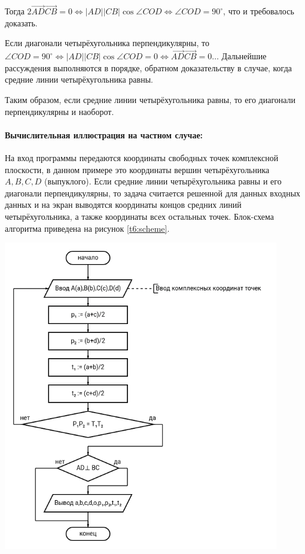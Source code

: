 {   Тогда \(2 \overrightarrow{AD} \overrightarrow{CB} = 0\Leftrightarrow \left\lvert AD\right\rvert
   \left\lvert CB\right\rvert \cos{\angle{COD}} \Leftrightarrow \angle{COD} = 90^\circ\),
   что и требовалось доказать.

   Если диагонали четырёхугольника перпендикулярны, то \(\angle{COD} = 90^\circ \Leftrightarrow \left\lvert AD\right\rvert \left\lvert CB\right\rvert \cos{\angle{COD}} = 0 \Leftrightarrow \overrightarrow{AD}\overrightarrow{CB}=
   0 \dots\)
   Дальнейшие рассуждения выполняются в порядке, обратном доказательству в случае, когда средние линии четырёхугольника равны.

   Таким образом, если средние линии четырёхугольника равны, то его диагонали перпендикулярны и наоборот.
   \paragraph{Вычислительная иллюстрация на частном случае:} На вход программы передаются координаты
   свободных точек комплексной плоскости, в данном примере это координаты вершин четырёхугольника
   \(A,B,C,D\) (выпуклого). Если средние линии четырёхугольника равны и его диагонали перпендикулярны,
   то задача считается решенной для данных входных данных и на экран выводятся координаты концов
   средних линий четырёхугольника, а также координаты всех остальных точек. Блок-схема алгоритма
   приведена на рисунок \ref{t6:scheme}.
   \begin{center}
      \includegraphics[width=0.9\textwidth]{images/task6-diagram.png}
      \label{t6:scheme}
   \end{center}
}
